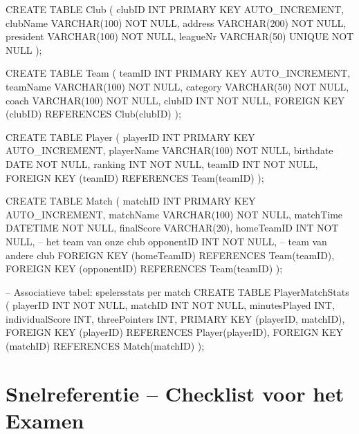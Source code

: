 \documentclass[a4paper,11pt]{article}
\begin{document}
\begin{sqllisting}
CREATE TABLE Club (
    clubID       INT          PRIMARY KEY AUTO_INCREMENT,
    clubName     VARCHAR(100) NOT NULL,
    address      VARCHAR(200) NOT NULL,
    president    VARCHAR(100) NOT NULL,
    leagueNr     VARCHAR(50)  UNIQUE NOT NULL
);

CREATE TABLE Team (
    teamID    INT          PRIMARY KEY AUTO_INCREMENT,
    teamName  VARCHAR(100) NOT NULL,
    category  VARCHAR(50)  NOT NULL,
    coach     VARCHAR(100) NOT NULL,
    clubID    INT          NOT NULL,
    FOREIGN KEY (clubID) REFERENCES Club(clubID)
);

CREATE TABLE Player (
    playerID   INT          PRIMARY KEY AUTO_INCREMENT,
    playerName VARCHAR(100) NOT NULL,
    birthdate  DATE         NOT NULL,
    ranking    INT          NOT NULL,
    teamID     INT          NOT NULL,
    FOREIGN KEY (teamID) REFERENCES Team(teamID)
);

CREATE TABLE Match (
    matchID     INT          PRIMARY KEY AUTO_INCREMENT,
    matchName   VARCHAR(100) NOT NULL,
    matchTime   DATETIME     NOT NULL,
    finalScore  VARCHAR(20),
    homeTeamID  INT          NOT NULL,        -- het team van onze club
    opponentID  INT          NOT NULL,        -- team van andere club
    FOREIGN KEY (homeTeamID) REFERENCES Team(teamID),
    FOREIGN KEY (opponentID) REFERENCES Team(teamID)
);

-- Associatieve tabel: spelersstats per match
CREATE TABLE PlayerMatchStats (
    playerID      INT  NOT NULL,
    matchID       INT  NOT NULL,
    minutesPlayed INT,
    individualScore INT,
    threePointers INT,
    PRIMARY KEY (playerID, matchID),
    FOREIGN KEY (playerID) REFERENCES Player(playerID),
    FOREIGN KEY (matchID)  REFERENCES Match(matchID)
);
\end{sqllisting}

\section{Snelreferentie -- Checklist voor het Examen}
\end{document}
